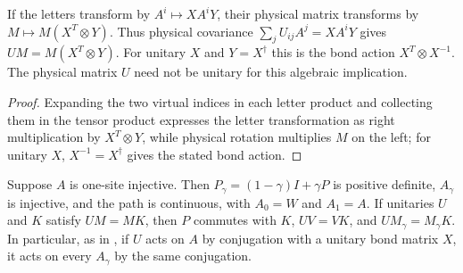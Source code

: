 \begin{lemma}
    \label{thm:spt_physical_matrix_covariance}
    \leanok
    If the letters transform by $A^i\mapsto XA^iY$, their physical
    matrix transforms by $M\mapsto M(X^T\otimes Y)$. Thus physical
    covariance $\sum_j U_{ij}A^j=XA^iY$ gives
    $UM=M(X^T\otimes Y)$. For unitary $X$ and $Y=X^\dagger$ this is
    the bond action $X^T\otimes X^{-1}$. The physical matrix $U$ need
    not be unitary for this algebraic implication.
\end{lemma}

\begin{proof}\leanok
    Expanding the two virtual indices in each letter product and collecting
    them in the tensor product expresses the letter transformation as right
    multiplication by $X^T\otimes Y$, while physical rotation multiplies $M$
    on the left; for unitary $X$, $X^{-1}=X^\dagger$ gives the stated bond
    action.
\end{proof}

\begin{lemma}
    \label{thm:spt_polar_deformation}
    \leanok
    Suppose $A$ is one-site injective. Then $P_\gamma=(1-\gamma)I+\gamma P$
    is positive definite, $A_\gamma$ is injective, and the path is continuous,
    with $A_0=W$ and $A_1=A$. If unitaries $U$ and $K$ satisfy $UM=MK$,
    then $P$ commutes with $K$, $UV=VK$, and $UM_\gamma=M_\gamma K$.
    In particular, as in \cite[Section~II.C, isometric form and symmetries]{Schuch2011Phases},
    if $U$ acts on $A$ by conjugation with a unitary bond
    matrix $X$, it acts on every $A_\gamma$ by the same conjugation.
\end{lemma}

